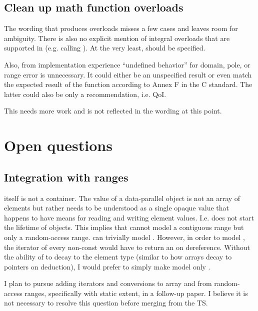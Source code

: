 \subsection{Clean up math function overloads}
The wording that produces  overloads misses a few cases and leaves room for ambiguity.
There is also no explicit mention of integral overloads that are supported in  (e.g.  calling ).
At the very least,  should be specified.

Also, from implementation experience ``undefined behavior'' for domain, pole, or range error is unnecessary.
It could either be an unspecified result or even match the expected result of the function according to Annex F in the C standard.
The latter could also be only a recommendation, i.e. QoI.

This needs more work and is not reflected in the wording at this point.


\section{Open questions}

\subsection{Integration with ranges}
 itself is not a container.
The value of a data-parallel object is not an array of elements but rather needs to be understood as a single opaque value that happens to have means for reading and writing element values.
I.e.  does not start the lifetime of  objects.
This implies that  cannot model a contiguous range but only a random-access range.
 can trivially model .
However, in order to model , the iterator of every non-const  would have to return an  on dereference.
Without the ability of  to decay to the element type (similar to how arrays decay to pointers on deduction), I would prefer to simply make  model only .

I plan to pursue adding iterators and conversions to array and from random-access ranges, specifically  with static extent, in a follow-up paper.
I believe it is not necessary to resolve this question before merging  from the TS.

